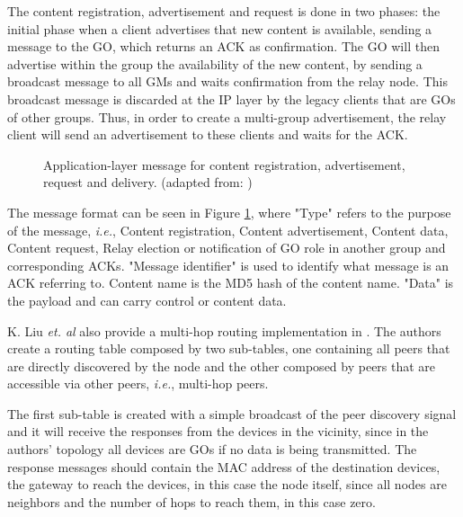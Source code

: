 The content registration, advertisement and request is done in two phases: the initial phase when a client advertises that new content is available, sending a message to the \gls{GO}, which returns an \gls{ACK} as confirmation. The \gls{GO} will then advertise within the group the availability of the new content, by sending a broadcast message to all \glspl{GM} and waits confirmation from the relay node. This broadcast message is discarded at the \gls{IP} layer by the legacy clients that are \glspl{GO} of other groups. Thus, in order to create a multi-group advertisement, the relay client will send an advertisement to these clients and waits for the \gls{ACK}.

\begin{figure}[ht]
	\noindent{}
	\caption{\label{fig:packet} Application-layer message for content registration, advertisement, request and delivery. (adapted from: \cite{routeMultiGroup})}
\end{figure}

The message format can be seen in Figure \ref{fig:packet}, where "Type" refers to the purpose of the message, \textit{i.e.}, Content registration, Content advertisement, Content data, Content request, Relay election or notification of \gls{GO} role in another group and corresponding \glspl{ACK}. "Message identifier" is used to identify what message is an \gls{ACK} referring to. Content name is the MD5 hash of the content name. "Data" is the payload and can carry control or content data.\newline

K. Liu \textit{et. al} also provide a multi-hop routing implementation in \cite{manet}. The authors create a routing table composed by two sub-tables, one containing all peers that are directly discovered by the node and the other composed by peers that are accessible via other peers, \textit{i.e.}, multi-hop peers.

The first sub-table is created with a simple broadcast of the peer discovery signal and it will receive the responses from the devices in the vicinity, since in the authors' topology all devices are \glspl{GO} if no data is being transmitted. The response messages should contain the \gls{MAC} address of the destination devices, the gateway to reach the devices, in this case the node itself, since all nodes are neighbors and the number of hops to reach them, in this case zero.

